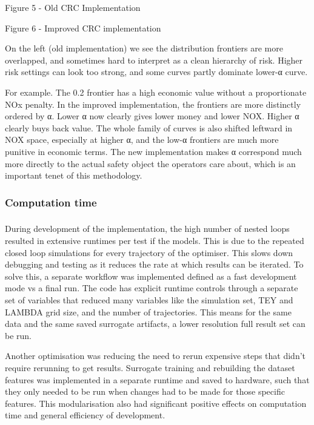 \documentclass[11pt]{article}
\begin{document}
\protect{}\label{_Toc228132498}{}Figure 5 - Old CRC
Implementation

\protect{}\label{_Toc228132499}{}Figure 6 - Improved CRC
implementation

On the left (old implementation) we see the distribution frontiers are
more overlapped, and sometimes hard to interpret as a clean hierarchy of
risk. Higher risk settings can look too strong, and some curves partly
dominate lower-α curve.

For example. The 0.2 frontier has a high economic value without a
proportionate NOx penalty. In the improved implementation, the frontiers
are more distinctly ordered by α. Lower α now clearly gives lower money
and lower NOX. Higher α clearly buys back value. The whole family of
curves is also shifted leftward in NOX space, especially at higher α,
and the low-α frontiers are much more punitive in economic terms. The
new implementation makes α correspond much more directly to the actual
safety object the operators care about, which is an important tenet of
this methodology.

\subsubsection{Computation time}\label{computation-time}

\subsubsection{}\label{section-10}

During development of the implementation, the high number of nested
loops resulted in extensive runtimes per test if the models. This is due
to the repeated closed loop simulations for every trajectory of the
optimiser. This slows down debugging and testing as it reduces the rate
at which results can be iterated. To solve this, a separate workflow was
implemented defined as a fast development mode vs a final run. The code
has explicit runtime controls through a separate set of variables that
reduced many variables like the simulation set, TEY and LAMBDA grid
size, and the number of trajectories. This means for the same data and
the same saved surrogate artifacts, a lower resolution full result set
can be run.

Another optimisation was reducing the need to rerun expensive steps that
didn't require rerunning to get results. Surrogate training and
rebuilding the dataset features was implemented in a separate runtime
and saved to hardware, such that they only needed to be run when changes
had to be made for those specific features. This modularisation also had
significant positive effects on computation time and general efficiency
of development.
\end{document}
